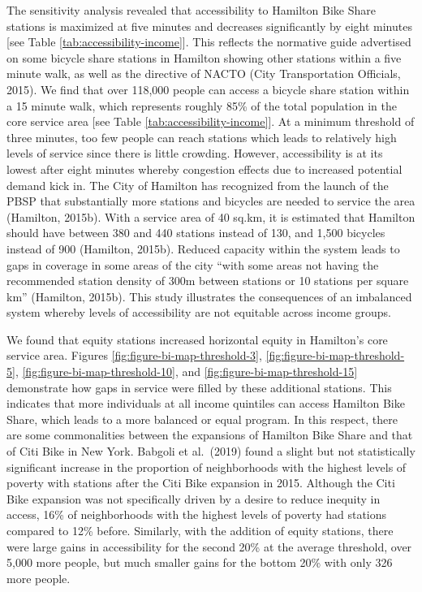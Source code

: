 \documentclass[]{elsarticle} %
\begin{document}
The sensitivity analysis revealed that accessibility to Hamilton Bike
Share stations is maximized at five minutes and decreases significantly
by eight minutes {[}see Table \ref{tab:accessibility-income}{]}. This
reflects the normative guide advertised on some bicycle share stations
in Hamilton showing other stations within a five minute walk, as well as
the directive of NACTO (City Transportation Officials, 2015). We find
that over 118,000 people can access a bicycle share station within a 15
minute walk, which represents roughly 85\% of the total population in
the core service area {[}see Table \ref{tab:accessibility-income}{]}. At
a minimum threshold of three minutes, too few people can reach stations
which leads to relatively high levels of service since there is little
crowding. However, accessibility is at its lowest after eight minutes
whereby congestion effects due to increased potential demand kick in.
The City of Hamilton has recognized from the launch of the PBSP that
substantially more stations and bicycles are needed to service the area
(Hamilton, 2015b). With a service area of 40 sq.km, it is estimated that
Hamilton should have between 380 and 440 stations instead of 130, and
1,500 bicycles instead of 900 (Hamilton, 2015b). Reduced capacity within
the system leads to gaps in coverage in some areas of the city ``with
some areas not having the recommended station density of 300m between
stations or 10 stations per square km'' (Hamilton, 2015b). This study
illustrates the consequences of an imbalanced system whereby levels of
accessibility are not equitable across income groups.

We found that equity stations increased horizontal equity in Hamilton's
core service area. Figures \ref{fig:figure-bi-map-threshold-3},
\ref{fig:figure-bi-map-threshold-5},
\ref{fig:figure-bi-map-threshold-10}, and
\ref{fig:figure-bi-map-threshold-15} demonstrate how gaps in service
were filled by these additional stations. This indicates that more
individuals at all income quintiles can access Hamilton Bike Share,
which leads to a more balanced or equal program. In this respect, there
are some commonalities between the expansions of Hamilton Bike Share and
that of Citi Bike in New York. Babgoli et al.~(2019) found a slight but
not statistically significant increase in the proportion of
neighborhoods with the highest levels of poverty with stations after the
Citi Bike expansion in 2015. Although the Citi Bike expansion was not
specifically driven by a desire to reduce inequity in access, 16\% of
neighborhoods with the highest levels of poverty had stations compared
to 12\% before. Similarly, with the addition of equity stations, there
were large gains in accessibility for the second 20\% at the average
threshold, over 5,000 more people, but much smaller gains for the bottom
20\% with only 326 more people.
\end{document}
